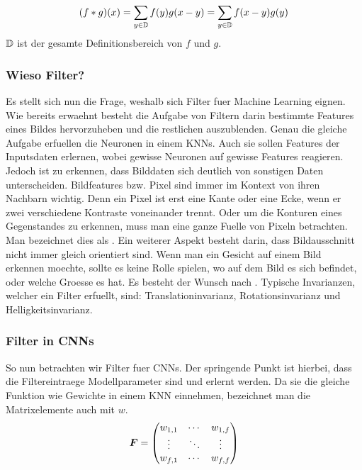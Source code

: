 \begin{equation}
  (f * g)(x) = \sum_{y \in \mathbb{D}} f(y)g(x-y) = \sum_{y \in \mathbb{D}} f(x-y)g(y)
\end{equation}
$\mathbb{D}$ ist der gesamte Definitionsbereich von $f$ und $g$.


\subsubsection{Wieso Filter?}
Es stellt sich nun die Frage, weshalb sich Filter fuer Machine
Learning eignen.
Wie bereits erwaehnt besteht die Aufgabe von Filtern darin bestimmte Features
eines Bildes hervorzuheben und die restlichen auszublenden. Genau die gleiche
Aufgabe erfuellen die Neuronen in einem KNNs. Auch sie sollen Features der
Inputsdaten erlernen, wobei gewisse Neuronen auf gewisse Features reagieren.
\para{}
Jedoch ist zu erkennen, dass Bilddaten sich deutlich von sonstigen Daten unterscheiden.
Bildfeatures bzw. Pixel sind immer im Kontext von ihren Nachbarn wichtig. Denn
ein Pixel ist erst eine Kante oder eine Ecke, wenn er zwei verschiedene
Kontraste voneinander trennt. Oder um die Konturen eines Gegenstandes zu
erkennen, muss man eine ganze Fuelle von Pixeln betrachten. Man bezeichnet
dies als .
\para{}
Ein weiterer Aspekt besteht darin, dass Bildausschnitt nicht immer gleich
orientiert sind. Wenn man ein Gesicht auf einem Bild erkennen moechte, sollte es
keine Rolle spielen, wo auf dem Bild es sich befindet, oder welche Groesse es
hat. Es besteht der Wunsch nach . Typische Invarianzen,
welcher ein Filter erfuellt, sind: Translationinvarianz, Rotationsinvarianz und Helligkeitsinvarianz.

\subsubsection{Filter in CNNs}
So nun betrachten wir Filter fuer CNNs. Der springende Punkt ist hierbei, dass
die Filtereintraege Modellparameter sind und erlernt werden. Da sie die gleiche
Funktion wie Gewichte in einem KNN einnehmen, bezeichnet man die Matrixelemente
auch mit $w$.
\begin{equation*}
  \bm{F} = \begin{pmatrix}
    w_{1,1} & \cdots & w_{1,f} \\
    \vdots & \ddots & \vdots \\
    w_{f,1} & \cdots & w_{f,f}
  \end{pmatrix}
\end{equation*}

